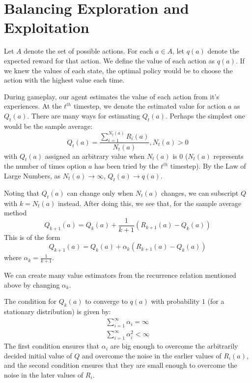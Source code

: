 \documentclass[12pt]{report}
\begin{document}
\section{Balancing Exploration and Exploitation}
Let $A$ denote the set of possible actions. For each $a \in A$, let $q(a)$ denote the expected reward for that action. We define the value of each action as $q(a)$. If we knew the values of each state,
the optimal policy would be to choose the action with the highest value each time.

During gameplay, our agent estimates the value of each action from it's experiences. At the $t^{th}$ timestep, we denote the estimated value for action $a$ as $Q_{t}(a)$.
There are many ways for estimating $Q_{t}(a)$. Perhaps the simplest one would be the sample average:
\begin{equation}
    Q_{t}(a) = \frac{\sum\limits_{i = 1}^{N_{t}(a)}R_{i}(a)}{N_{t}(a)}, N_{t}(a) > 0
\end{equation}
with $Q_{t}(a)$ assigned an arbitrary value when $N_{t}(a)$ is $0$ ($N_{t}(a)$ represents the number of times option $a$ has been tried by the $t^{th}$ timestep). By the Law of Large Numbers, as $N_{t}(a) \rightarrow \infty$, $Q_{t}(a) \rightarrow q(a)$.

Noting that $Q_{t}(a)$ can change only when $N_{t}(a)$ changes, we can subscript $Q$ with $k = N_{t}(a)$ instead. After doing this, we see that, for the sample average method
\begin{equation}
    Q_{k + 1}(a) = Q_{k}(a) + \frac{1}{k + 1}(R_{k + 1}(a) - Q_{k}(a))
\end{equation}
This is of the form
\begin{equation}
    Q_{k + 1}(a) = Q_{k}(a) + \alpha_{k}(R_{k + 1}(a) - Q_{k}(a))
\end{equation}
where $\alpha_{k} = \frac{1}{k + 1}$.

We can create many value estimators from the recurrence relation mentioned above by changing $\alpha_{k}$. 

The condition for $Q_{k}(a)$ to converge to $q(a)$ with probability $1$ (for a stationary distribution) is given by:
\begin{eqnarray}
    \sum\limits_{i = 1}^{\infty} \alpha_{i} = \infty\\
    \sum\limits_{i = 1}^{\infty} \alpha_{i}^{2} < \infty
\end{eqnarray}
The first condition ensures that $\alpha_{i}$ are big enough to overcome the arbitrarily decided initial value of $Q$ and overcome the noise in the earlier values of $R_{i}(a)$, and 
the second condition ensures that they are small enough to overcome the noise in the later values of $R_{i}$.
\end{document}
